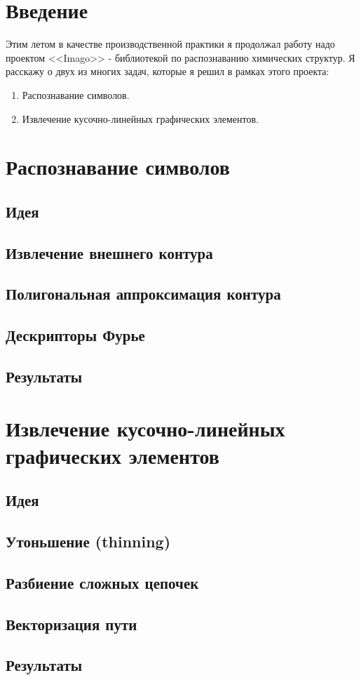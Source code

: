 





\renewcommand{\cftsecleader}{\cftdotfill{\cftsubsecdotsep}}
\tableofcontents

\pagebreak

\section{Введение}

Этим летом в качестве производственной практики я продолжал работу
надо проектом <<Imago>> - библиотекой по распознаванию химических
структур. Я расскажу о двух из многих задач, которые я решил в рамках
этого проекта:
\begin{enumerate}
\item Распознавание символов.
\item Извлечение кусочно-линейных графических элементов.
\end{enumerate}

\section{Распознавание символов}

\subsection{Идея}
\subsection{Извлечение внешнего контура}
\subsection{Полигональная аппроксимация контура}
\subsection{Дескрипторы Фурье}
\subsection{Результаты}

\section{Извлечение кусочно-линейных графических элементов}

\subsection{Идея}
\subsection{Утоньшение (thinning)}
\subsection{Разбиение сложных цепочек}
\subsection{Векторизация пути}
\subsection{Результаты}



